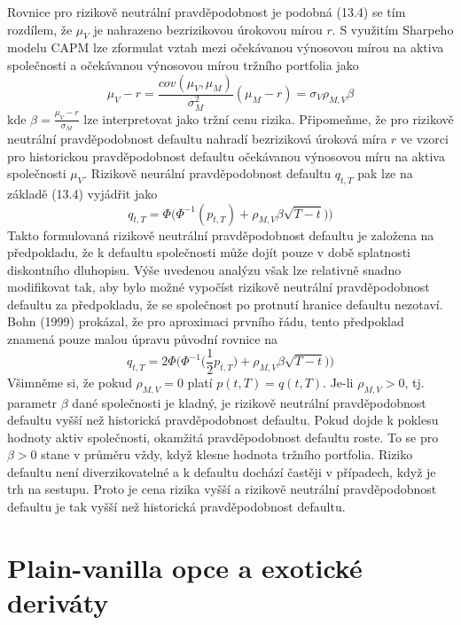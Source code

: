 \documentclass[a4paper]{book}
\begin{document}
Rovnice pro rizikově neutrální pravděpodobnost je podobná (13.4) se tím rozdílem, že $\mu_V$ je nahrazeno bezrizikovou úrokovou mírou $r$. S využitím Sharpeho modelu CAPM lze zformulat vztah mezi očekávanou výnosovou mírou na aktiva společnosti a očekávanou výnosovou mírou tržního portfolia jako
\begin{equation*}
\mu_V - r = \frac{cov(\mu_V, \mu_M)}{\sigma_M^2}(\mu_M - r) = \sigma_V \rho_{M,V} \beta
\end{equation*}
kde $\beta = \frac{\mu_V - r}{\sigma_M}$ lze interpretovat jako tržní cenu rizika. Připomeňme, že pro rizikově neutrální pravděpodobnost defaultu nahradí bezriziková úroková míra $r$ ve vzorci pro historickou pravděpodobnost defaultu očekávanou výnosovou míru na aktiva společnosti $\mu_V$. Rizikově neurální pravděpodobnost defaultu $q_{t,T}$ pak lze na základě (13.4) vyjádřit jako
\begin{equation*}
q_{t,T} = \Phi \big( \Phi^{-1}(p_{t,T}) + \rho_{M,V}\beta \sqrt{T-t})\Big)
\end{equation*}
Takto formulovaná rizikově neutrální pravděpodobnost defaultu je založena na předpokladu, že k defaultu společnosti může dojít pouze v době splatnosti diskontního dluhopisu. Výše uvedenou analýzu však lze relativně snadno modifikovat tak, aby bylo možné vypočíst rizikově neutrální pravděpodobnost defaultu za předpokladu, že se společnost po protnutí hranice defaultu nezotaví. Bohn (1999) prokázal, že pro aproximaci prvního řádu, tento předpoklad znamená pouze malou úpravu původní rovnice na
\begin{equation*}
q_{t,T} = 2\Phi \Big( \Phi^{-1}\Big(\frac{1}{2}p_{t,T}\Big) + \rho_{M,V}\beta \sqrt{T-t})\Big)
\end{equation*}
Všimněme si, že pokud $\rho_{M,V} = 0$ platí $p(t,T) = q(t,T)$. Je-li $\rho_{M,V} > 0$, tj. parametr $\beta$ dané společnosti je kladný, je rizikově neutrální pravděpodobnost defaultu vyšší než historická pravděpodobnost defaultu. Pokud dojde k poklesu hodnoty aktiv společnosti, okamžitá pravděpodobnost defaultu roste. To se pro $\beta > 0$ stane v průměru vždy, když klesne hodnota tržního portfolia. Riziko defaultu není diverzikovatelné a k defaultu dochází častěji v případech, když je trh na sestupu. Proto je cena rizika vyšší a rizikově neutrální pravděpodobnost defaultu je tak vyšší než historická pravděpodobnost defaultu.

\part{Plain-vanilla opce a exotické deriváty}
\end{document}
